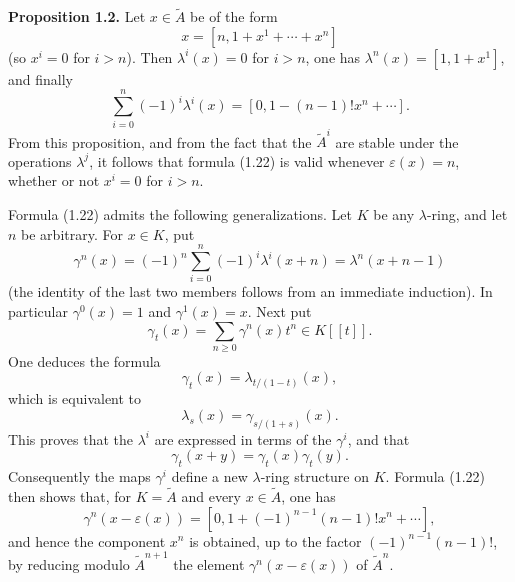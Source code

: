 \textbf{Proposition 1.2.} Let $x\in\widetilde A$ be of the form
\[
x=[n,1+x^1+\cdots+x^n]
\]
(so $x^i=0$ for $i>n$). Then $\lambda^i(x)=0$ for $i>n$, one has $\lambda^n(x)=[1,1+x^1]$, and finally
\begin{equation}\tag{1.22}
\sum_{i=0}^{n}(-1)^i\lambda^i(x)=[0,1-(n-1)!x^n+\cdots].
\end{equation}
From this proposition, and from the fact that the $\widetilde A^i$ are stable under the operations $\lambda^j$, it follows that formula (1.22) is valid whenever $\varepsilon(x)=n$, whether or not $x^i=0$ for $i>n$.

Formula (1.22) admits the following generalizations. Let $K$ be any $\lambda$-ring, and let $n$ be arbitrary. For $x\in K$, put
\begin{equation}\tag{1.23}
\gamma^n(x)=(-1)^n\sum_{i=0}^{n}(-1)^i\lambda^i(x+n)=\lambda^n(x+n-1)
\end{equation}
(the identity of the last two members follows from an immediate induction). In particular $\gamma^0(x)=1$ and $\gamma^1(x)=x$. Next put
\begin{equation}\tag{1.24}
\gamma_t(x)=\sum_{n\geq 0}\gamma^n(x)t^n\in K[[t]].
\end{equation}
One deduces the formula
\begin{equation}\tag{1.25}
\gamma_t(x)=\lambda_{t/(1-t)}(x),
\end{equation}
which is equivalent to
\begin{equation}\tag{1.25 bis}
\lambda_s(x)=\gamma_{s/(1+s)}(x).
\end{equation}
This proves that the $\lambda^i$ are expressed in terms of the $\gamma^i$, and that
\[
\gamma_t(x+y)=\gamma_t(x)\gamma_t(y).
\]
Consequently the maps $\gamma^i$ define a new $\lambda$-ring structure on $K$. Formula (1.22) then shows that, for $K=\widetilde A$ and every $x\in\widetilde A$, one has
\begin{equation}\tag{1.22 bis}
\gamma^n(x-\varepsilon(x))=[0,1+(-1)^{n-1}(n-1)!x^n+\cdots],
\end{equation}
and hence the component $x^n$ is obtained, up to the factor $(-1)^{n-1}(n-1)!$, by reducing modulo $\widetilde A^{n+1}$ the element $\gamma^n(x-\varepsilon(x))$ of $\widetilde A^n$.


